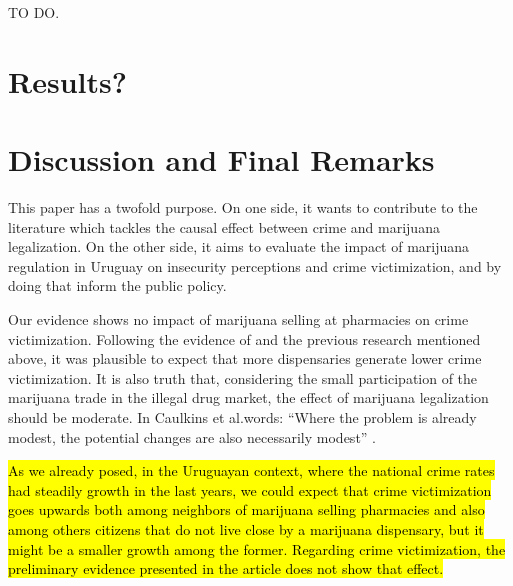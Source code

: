 \documentclass[11pt]{article}
\begin{document}
TO DO.

\section{Results?}

\section{Discussion and Final Remarks}
This paper has a twofold purpose. On one side, it wants to contribute to the literature which tackles the causal effect between crime and marijuana legalization. On the other side, it aims to evaluate the impact of marijuana regulation in Uruguay on insecurity perceptions and crime victimization, and by doing that inform the public policy.

Our evidence shows no impact of marijuana selling at pharmacies on crime victimization. Following the evidence of \citet{dragone2019crime} and the previous research mentioned above, it was plausible to expect that more dispensaries generate lower crime victimization. It is also truth that, considering the small participation of the marijuana trade in the illegal drug market, the effect of marijuana legalization should be moderate. In Caulkins et al.words: ``Where the problem is already modest, the potential changes are also necessarily modest'' \citep[154]{caulkins2015considering}.

\hl{As we already posed, in the Uruguayan context, where the national crime rates had steadily growth in the last years, we could expect that crime victimization goes upwards both among neighbors of marijuana selling pharmacies and also among others citizens that do not live close by a marijuana dispensary, but it might be a smaller growth among the former. Regarding crime victimization, the preliminary evidence presented in the article does not show that effect.}
\end{document}
